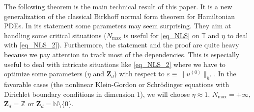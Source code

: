 \label{sec_BNF_LR}

The following theorem is the main technical result of this paper. It is a new generalization of the classical Birkhoff normal form theorem for Hamiltonian PDEs. In its statement some parameters may seem surprising. They aim at handling some critical situations ($N_{\max}$ is useful for \eqref{eq_NLS} on $\mathbb{T}$ and $\eta$ to deal with \eqref{eq_NLS_2}). Furthermore, the statement and the proof are quite heavy because we pay attention to track most of the dependencies. This is especially useful to deal with intricate situations like \eqref{eq_NLS_2} where we have to optimize some parameters ($\eta$ and $\mathbf{Z}_d$) with respect to $\varepsilon \equiv \|u^{(0)} \|_{h^s}$. In the favorable cases (\eg the nonlinear Klein-Gordon or Schrödinger equations with Dirichlet boundary conditions in dimension $1$), we will choose $\eta\approx 1$, $N_{\max}=+\infty$, $\mathbf{Z}_d = \mathbb{Z}$ or $\mathbf{Z}_d = \mathbb{N}\setminus \{0\}$.
